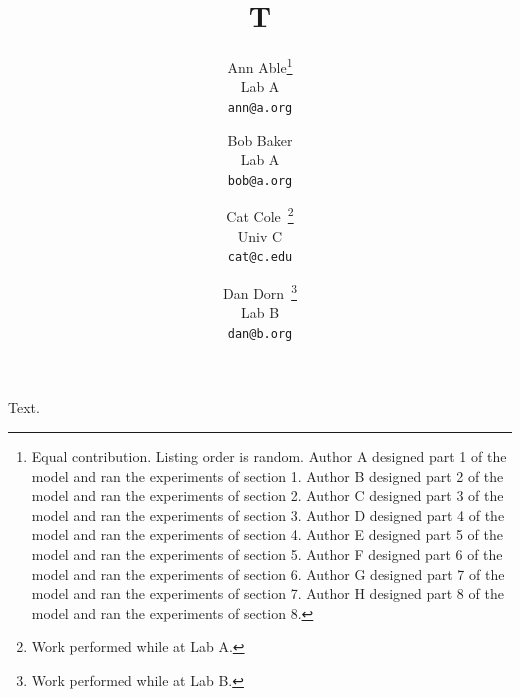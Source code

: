 \documentclass{article}
\title{T}
\author{Ann Able\thanks{Equal contribution. Listing order is random. Author A designed part 1 of the model and ran the experiments of section 1. Author B designed part 2 of the model and ran the experiments of section 2. Author C designed part 3 of the model and ran the experiments of section 3. Author D designed part 4 of the model and ran the experiments of section 4. Author E designed part 5 of the model and ran the experiments of section 5. Author F designed part 6 of the model and ran the experiments of section 6. Author G designed part 7 of the model and ran the experiments of section 7. Author H designed part 8 of the model and ran the experiments of section 8.}\\ Lab A\\ \texttt{ann@a.org} \and
Bob Baker\footnotemark[1]\\ Lab A\\ \texttt{bob@a.org} \and
Cat Cole\footnotemark[1]\ \thanks{Work performed while at Lab A.}\\ Univ C\\ \texttt{cat@c.edu} \and
Dan Dorn\footnotemark[1]\ \thanks{Work performed while at Lab B.}\\ Lab B\\ \texttt{dan@b.org}}
\date{}
\begin{document}
\maketitle
Text.
\end{document}

